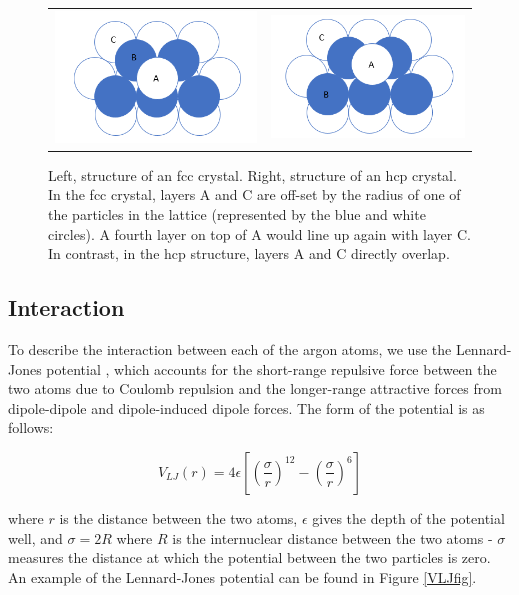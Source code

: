 \documentclass{article}
\begin{document}
\begin{multicols}{2}
\begin{figure}[H]
\begin{center}
\begin{tabular}{ c c }
\includegraphics[width=0.45\linewidth]{plots/fcc_crystal.png} & \includegraphics[width=0.45\linewidth]{plots/hcp_crystal.png}
\end{tabular}
\caption{Left, structure of an fcc crystal.  Right, structure of an hcp crystal.  In the fcc crystal, layers A and C are off-set by the radius of one of the particles in the lattice (represented by the blue and white circles).  A fourth layer on top of A would line up again with layer C.  In contrast, in the hcp structure, layers A and C directly overlap.}
\label{fcc}
\end{center}
\end{figure}

\subsection{Interaction}

To describe the interaction between each of the argon atoms, we use the Lennard-Jones potential \cite{verlet}, which accounts for the short-range repulsive force between the two atoms due to Coulomb repulsion and the longer-range attractive forces from dipole-dipole and dipole-induced dipole forces.  The form of the potential is as follows:

\begin{equation}
\label{LJpot}
V_{LJ}(r) = 4 \epsilon \left [ \left (\frac{\sigma}{r} \right )^{12} - \left (\frac{\sigma}{r} \right )^{6} \right ]
\end{equation}

\noindent where $r$ is the distance between the two atoms, $\epsilon$ gives the depth of the potential well, and $\sigma = 2R $ where $R$ is the internuclear distance between the two atoms - $\sigma$ measures the distance at which the potential between the two particles is zero.  An example of the Lennard-Jones potential can be found in Figure \ref{VLJfig}.


\end{multicols}
\end{document}
